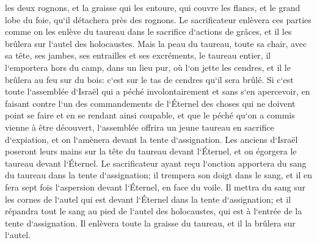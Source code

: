 \verse les deux rognons, et la graisse qui les entoure, qui couvre les flancs, et le grand lobe du foie, qu`il détachera près des rognons. 
\verse Le sacrificateur enlèvera ces parties comme on les enlève du taureau dans le sacrifice d`actions de grâces, et il les brûlera sur l`autel des holocaustes. 
\verse Mais la peau du taureau, toute sa chair, avec sa tête, ses jambes, ses entrailles et ses excréments, 
\verse le taureau entier, il l`emportera hors du camp, dans un lieu pur, où l`on jette les cendres, et il le brûlera au feu sur du bois: c`est sur le tas de cendres qu`il sera brûlé. 
\verse Si c`est toute l`assemblée d`Israël qui a péché involontairement et sans s`en apercevoir, en faisant contre l`un des commandements de l`Éternel des choses qui ne doivent point se faire et en se rendant ainsi coupable, 
\verse et que le péché qu`on a commis vienne à être découvert, l`assemblée offrira un jeune taureau en sacrifice d`expiation, et on l`amènera devant la tente d`assignation. 
\verse Les anciens d`Israël poseront leurs mains sur la tête du taureau devant l`Éternel, et on égorgera le taureau devant l`Éternel. 
\verse Le sacrificateur ayant reçu l`onction apportera du sang du taureau dans la tente d`assignation; 
\verse il trempera son doigt dans le sang, et il en fera sept fois l`aspersion devant l`Éternel, en face du voile. 
\verse Il mettra du sang sur les cornes de l`autel qui est devant l`Éternel dans la tente d`assignation; et il répandra tout le sang au pied de l`autel des holocaustes, qui est à l`entrée de la tente d`assignation. 
\verse Il enlèvera toute la graisse du taureau, et il la brûlera sur l`autel. 
